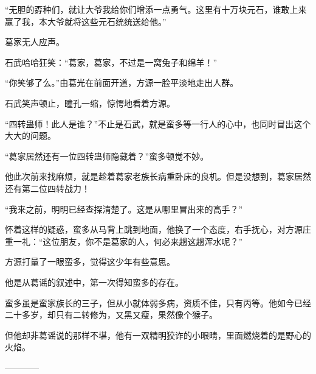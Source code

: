 \begin{this_body}
“无胆的孬种们，就让大爷我给你们增添一点勇气。这里有十万块元石，谁敢上来赢了我，本大爷就将这些元石统统送给他。”

葛家无人应声。

石武哈哈狂笑：“葛家，葛家，不过是一窝兔子和绵羊！”

“你笑够了么。”由葛光在前面开道，方源一脸平淡地走出人群。

石武笑声顿止，瞳孔一缩，惊愕地看着方源。

“四转蛊师！此人是谁？”不止是石武，就是蛮多等一行人的心中，也同时冒出这个大大的问题。

“葛家居然还有一位四转蛊师隐藏着？”蛮多顿觉不妙。

他此次前来找麻烦，就是趁着葛家老族长病重卧床的良机。但是没想到，葛家居然还有第二位四转战力！

“我来之前，明明已经查探清楚了。这是从哪里冒出来的高手？”

怀着这样的疑惑，蛮多从马背上跳到地面，他换了一个态度，右手抚心，对方源庄重一礼：“这位朋友，你不是葛家的人，何必来趟这趟浑水呢？”

方源打量了一眼蛮多，觉得这少年有些意思。

他是从葛谣的叙述中，第一次得知蛮多的存在。

蛮多虽是蛮家族长的三子，但从小就体弱多病，资质不佳，只有丙等。他如今已经二十多岁，却只有二转修为，又黑又瘦，果然像个猴子。

但他却非葛谣说的那样不堪，他有一双精明狡诈的小眼睛，里面燃烧着的是野心的火焰。

------------

\end{this_body}

